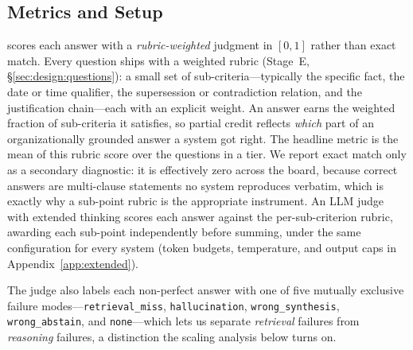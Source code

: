 %

\subsection{Metrics and Setup}
\label{sec:exp:metrics}

\bench{} scores each answer with a \emph{rubric-weighted} judgment in $[0,1]$
rather than exact match. Every question ships with a weighted rubric (Stage~E,
\S\ref{sec:design:questions}): a small set of sub-criteria---typically the
specific fact, the date or time qualifier, the supersession or contradiction
relation, and the justification chain---each with an explicit weight. An answer
earns the weighted fraction of sub-criteria it satisfies, so partial credit
reflects \emph{which} part of an organizationally grounded answer a system got
right. The headline metric is the mean of this rubric score over the questions
in a tier. We report exact match only as a secondary diagnostic: it is
effectively zero across the board, because correct answers are multi-clause
statements no system reproduces verbatim, which is exactly why a sub-point rubric
is the appropriate instrument. An LLM judge with extended thinking scores each
answer against the per-sub-criterion rubric, awarding each sub-point
independently before summing, under the same configuration for every system
(token budgets, temperature, and output caps in Appendix~\ref{app:extended}).

The judge also labels each non-perfect answer with one of five mutually exclusive
failure modes---\texttt{retrieval\_miss}, \texttt{hallucination},
\texttt{wrong\_synthesis}, \texttt{wrong\_abstain}, and \texttt{none}---which lets
us separate \emph{retrieval} failures from \emph{reasoning} failures, a
distinction the scaling analysis below turns on.

